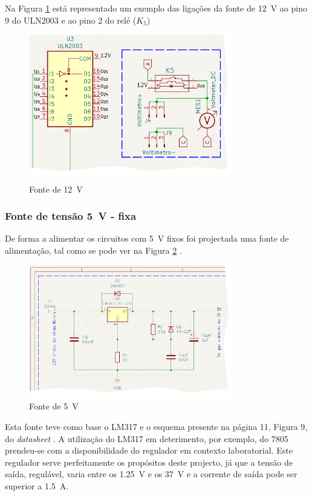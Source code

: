 Na Figura \ref{fig:fonte12V} está representado um exemplo das ligações da fonte de \SI{12}{\volt} ao pino 9 do ULN2003 e ao pino 2 do relé ($K_{5}$)

\begin{figure}[hbtp]
	\centering
	\includegraphics[width=0.8\textwidth]{figures/sch_fonte12V.png}
	\caption{Fonte de \SI{12}{\volt}}
	\label{fig:fonte12V}
\end{figure}

\subsubsection{Fonte de tensão \SI{5}{\volt} - fixa}
De forma a alimentar os circuitos com \SI{5}{\volt} fixos foi projectada uma fonte de alimentação, tal como se pode ver na Figura \ref{fig:fonte5V} \cite{LM317}.

\begin{figure}[hbtp]
	\centering
	\includegraphics[width=0.8\textwidth]{figures/sch_fonte5V.png}
	\caption{Fonte de \SI{5}{\volt}}
	\label{fig:fonte5V}
\end{figure}

Esta fonte teve como base o LM317 e o esquema presente na página 11, Figura 9, do \textit{datasheet} \cite{LM317}. A utilização do LM317 em deterimento, por exemplo, do 7805 prendeu-se com a disponibilidade do regulador em contexto laboratorial. Este regulador serve perfeitamente os propósitos deste projecto, já que a tensão de saída, regulável, varia entre os \SI{1.25}{\volt} e os \SI{37}{\volt} e a corrente de saída pode ser superior a \SI{1.5}{\ampere}.

